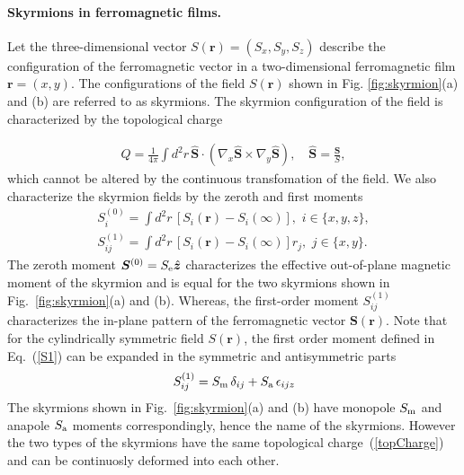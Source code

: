 \documentclass[twocolumn,showpacs,floatfix,nofootinbib,longbibliography]{revtex4-1}
\begin{document}
\paragraph*{Skyrmions in ferromagnetic films.} \label{sec:skyrmion}


Let the three-dimensional vector $S(\bm r) = (S_x,S_y,S_z)$ describe the configuration of the ferromagnetic vector in a two-dimensional ferromagnetic film $\bm r = (x,y)$. The configurations of the field $S(\bm r)$ shown in Fig. \ref{fig:skyrmion}(a) and (b) are referred to as skyrmions. The skyrmion configuration of the field is characterized by the topological charge 

\begin{align}
	Q = \frac{1}{4\pi} \int d^2r \, \hat {\bm S}\cdot (\nabla_x\hat {\bm S}\times\nabla_y\hat {\bm S}), \quad \hat {\bm S}= \frac{\bm S}{S}, 
	\label{topCharge}
\end{align}
which cannot be altered by the continuous transfomation of the field.  We also characterize the skyrmion fields by the zeroth and first moments
\begin{align}
	S^{(0)}_i = \int  d^2r \, \left[S_i(\bm r)-S_i(\infty)\right],\,\, i\in \{x,y,z\}, \label{S0} \\
	S^{(1)}_{ij} = \int  d^2r \, \left[S_i(\bm r)-S_i(\infty)\right] r_j,\,\, j\in \{x,y\}. \label{S1}
\end{align}
The zeroth moment $\bm S^{(0)} = S_{\rm e} \hat{\bm z}$ characterizes the effective out-of-plane magnetic moment of the skyrmion and is equal for the two skyrmions shown in Fig.~{\ref{fig:skyrmion}}(a) and (b). Whereas, the first-order moment $S^{(1)}_{ij}$ characterizes the in-plane pattern of the ferromagnetic vector $\bm S(\bm r)$. Note that for the cylindrically symmetric field $S(\bm r)$, the first order moment defined in Eq.~(\ref{S1}) can be expanded in the symmetric and antisymmetric parts 
\begin{equation}
	S^{(1)}_{ij}=S_{\rm m}\,\delta_{ij} + S_{\rm a}\,\epsilon_{ijz}
\end{equation}	
The skyrmions shown in Fig.~\ref{fig:skyrmion}(a) and (b) have monopole $S_{\rm m}$ and anapole $S_{\rm a}$ moments correspondingly, hence the name of the skyrmions. However the two types of the skyrmions have the same topological charge~(\ref{topCharge}) and can be continuosly deformed into each other. 
\end{document}
